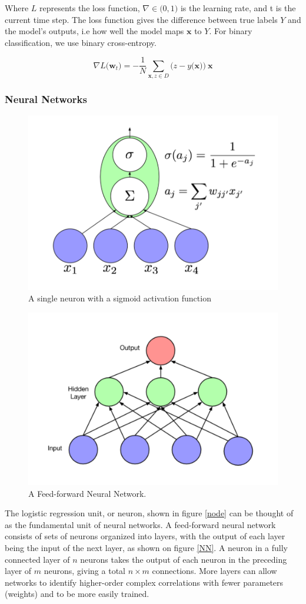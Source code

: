 \documentclass{article}
\renewcommand{\vec}[1]{\mathbf{#1}}
\begin{document}
Where \( L\) represents the loss function, \(\nabla \in \big(0, 1 \big)\) is the learning rate, and t is the current time step. The loss function gives the difference between true labels \(Y\) and the model's outputs, i.e how well the model maps \(\vec{x}\) to  \(Y\). For binary classification, we use binary cross-entropy.

\begin{equation}
\nabla L \big(\vec{w}_{t}\big) =  -\frac{1}{N}  \sum_{ \vec{x}, z \in D } \big(z-y \big( \vec{x} \big) \big)\ \vec{x}
\end{equation}

\subsubsection{\label{sec:level3}Neural Networks}

\begin{figure}
\centering
\includegraphics[width=0.5\linewidth]{node.png}
\caption{A single neuron with a sigmoid activation function}
\label{fig:node}
\end{figure}

\begin{figure}
\centering
\includegraphics[width=0.5\linewidth]{basic_net.png}
\caption{A Feed-forward Neural Network.}
\label{fig:NN}
\end{figure}

The logistic regression unit, or neuron, shown in figure \ref{node} can be thought of as the fundamental unit of neural networks.  A feed-forward neural network consists of sets of neurons organized into layers, with the output of each layer being the input of the next layer, as shown on figure \ref{NN}. A neuron in a fully connected layer of \(n\) neurons takes the output of each neuron in the preceding layer of \(m\) neurons, giving a total \(n \times m\) connections. More layers can allow networks to identify higher-order complex correlations with fewer parameters (weights) and to be more easily trained. 
\end{document}
